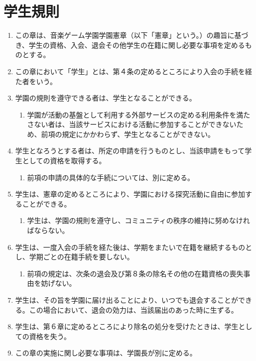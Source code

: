\newpage
\chapter{学生規則}
\begin{enumerate}[label=第\arabic*条　]
  \item この章は、音楽ゲーム学園学園憲章（以下「憲章」という。）の趣旨に基づき、学生の資格、入会、退会その他学生の在籍に関し必要な事項を定めるものとする。
  \item この章において「学生」とは、第４条の定めるところにより入会の手続を経た者をいう。
  \item 学園の規則を遵守できる者は、学生となることができる。
    \begin{enumerate}[label=\arabic*　,start=2,leftmargin=*]
      \item 学園が活動の基盤として利用する外部サービスの定める利用条件を満たさない者は、当該サービスにおける活動に参加することができないため、前項の規定にかかわらず、学生となることができない。
    \end{enumerate}
  \item 学生となろうとする者は、所定の申請を行うものとし、当該申請をもって学生としての資格を取得する。
    \begin{enumerate}[label=\arabic*　,start=2,leftmargin=*]
      \item 前項の申請の具体的な手続については、別に定める。
    \end{enumerate}
  \item 学生は、憲章の定めるところにより、学園における探究活動に自由に参加することができる。
    \begin{enumerate}[label=\arabic*　,start=2,leftmargin=*]
      \item 学生は、学園の規則を遵守し、コミュニティの秩序の維持に努めなければならない。
    \end{enumerate}
  \item 学生は、一度入会の手続を経た後は、学期をまたいで在籍を継続するものとし、学期ごとの在籍手続を要しない。
    \begin{enumerate}[label=\arabic*　,start=2,leftmargin=*]
      \item 前項の規定は、次条の退会及び第８条の除名その他の在籍資格の喪失事由を妨げない。
    \end{enumerate}
  \item 学生は、その旨を学園に届け出ることにより、いつでも退会することができる。この場合において、退会の効力は、当該届出のあった時に生ずる。
  \item 学生は、第６章に定めるところにより除名の処分を受けたときは、学生としての資格を失う。
  \item この章の実施に関し必要な事項は、学園長が別に定める。
\end{enumerate}